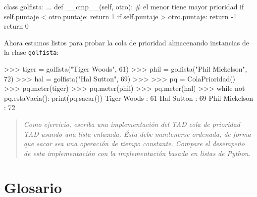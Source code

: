 \beforeverb 
\begin{pythoncode}
class golfista:
  ...
  def __cmp__(self, otro):
    # el menor tiene mayor prioridad
    if self.puntaje < otro.puntaje: return  1   
    if self.puntaje > otro.puntaje: return -1
    return 0
\end{pythoncode}
\afterverb Ahora estamos listos para probar la cola de prioridad
almacenando instancias de la clase \texttt{golfista}:

\beforeverb 
\begin{pyconcode}
>>> tiger = golfista("Tiger Woods",    61)
>>> phil  = golfista("Phil Mickelson", 72)
>>> hal   = golfista("Hal Sutton",     69)
>>>
>>> pq = ColaPrioridad()
>>> pq.meter(tiger)
>>> pq.meter(phil)
>>> pq.meter(hal)
>>> while not pq.estaVacia(): print(pq.sacar())
Tiger Woods    : 61
Hal Sutton     : 69
Phil Mickelson : 72
\end{pyconcode}
\afterverb
\begin{quote}
{\em Como ejercicio, escriba una implementación del TAD cola de
prioridad TAD usando una lista enlazada. Ésta debe mantenerse ordenada,
de forma que sacar sea una operación de tiempo constante. Compare
el desempeño de esta implementación con la implementación basada en
listas de Python.} 
\end{quote}

\section{Glosario}


